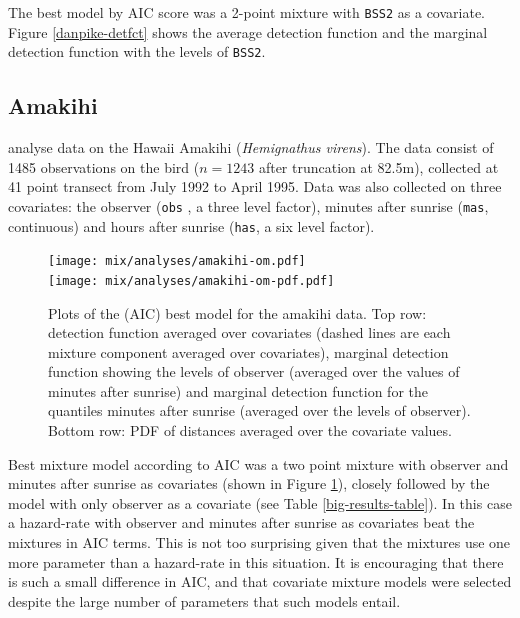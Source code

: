 The best model by AIC score was a 2-point mixture with \texttt{BSS2} as a covariate. Figure \ref{danpike-detfct} shows the average detection function and the marginal detection function with the levels of \texttt{BSS2}.

\subsection{Amakihi}
 analyse data on the Hawaii Amakihi (\textit{Hemignathus virens}). The data consist of 1485 observations on the bird ($n=1243$ after truncation at 82.5m), collected at 41 point transect from July 1992 to April 1995. Data was also collected on three covariates: the observer (\texttt{obs} , a three level factor), minutes after sunrise (\texttt{mas}, continuous) and hours after sunrise (\texttt{has}, a six level factor).

\begin{figure}
\centering
\texttt{[image: mix/analyses/amakihi-om.pdf]}\\
\texttt{[image: mix/analyses/amakihi-om-pdf.pdf]}
\caption{Plots of the (AIC) best model for the amakihi data. Top row: detection function averaged over covariates (dashed lines are each mixture component averaged over covariates), marginal detection function showing the levels of observer (averaged over the values of minutes after sunrise) and marginal detection function for the quantiles minutes after sunrise (averaged over the levels of observer). Bottom row: PDF of distances averaged over the covariate values.}
\label{amakihi}
\end{figure}

Best mixture model according to AIC was a two point mixture with observer and minutes after sunrise as covariates (shown in Figure \ref{amakihi}), closely followed by the model with only observer as a covariate (see Table \ref{big-results-table}). In this case a hazard-rate with observer and minutes after sunrise as covariates beat the mixtures in AIC terms. This is not too surprising given that the mixtures use one more parameter than a hazard-rate in this situation. It is encouraging that there is such a small difference in AIC, and that covariate mixture models were selected despite the large number of parameters that such models entail.


